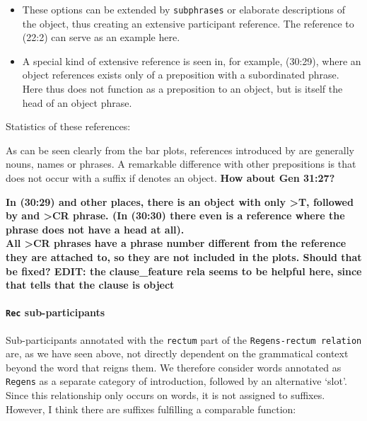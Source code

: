 \documentclass{report}
\newcommand{\mi}[1]{\lstinline{#1}}
\newcommand{\hebr}[1]{\cjRL{#1}}
\begin{document}
\begin{itemize}
\item These options can be extended by \mi{subphrases} or elaborate descriptions of the object, thus creating an extensive participant reference. The reference to (22:2) can serve as an example here.
\item A special kind of extensive reference is seen in, for example, (30:29), where an object references exists only of a preposition \hebr{>T} with a subordinated \hebr{>CR} phrase. Here \hebr{>T} thus does not function as a preposition to an object, but is itself the head of an object phrase.
\end{itemize}

Statistics of these references: \\
\noindent
\begin{minipage}{.5\textwidth}

\end{minipage}
\begin{minipage}{.5\textwidth}
\centering

\end{minipage}
As can be seen clearly from the bar plots, references introduced by \hebr{>T} are generally nouns, names or phrases. A remarkable difference with other prepositions is that \hebr{>T} does not occur with a suffix if \hebr{>T} denotes an object. \textbf{How about Gen 31:27?}

\textbf{In (30:29) and other places, there is an object with only >T, followed by and >CR phrase. (In (30:30) there even is a reference where the \hebr{>CR} phrase does not have a head at all).}\\
\textbf{All >CR phrases have a phrase number different from the reference they are attached to, so they are not included in the plots. Should that be fixed? EDIT: the clause\_feature rela seems to be helpful here, since that tells that the clause is object}

\paragraph{\mi{Rec} sub-participants}
Sub-participants annotated with the \mi{rectum} part of the \mi{Regens-rectum relation} are, as we have seen above, not directly dependent on the grammatical context beyond the word that reigns them. We therefore consider words annotated as \mi{Regens} as a separate category of introduction, followed by an alternative `slot'. Since this relationship only occurs on words, it is not assigned to suffixes. However, I think there are suffixes fulfilling a comparable function:
\end{document}
